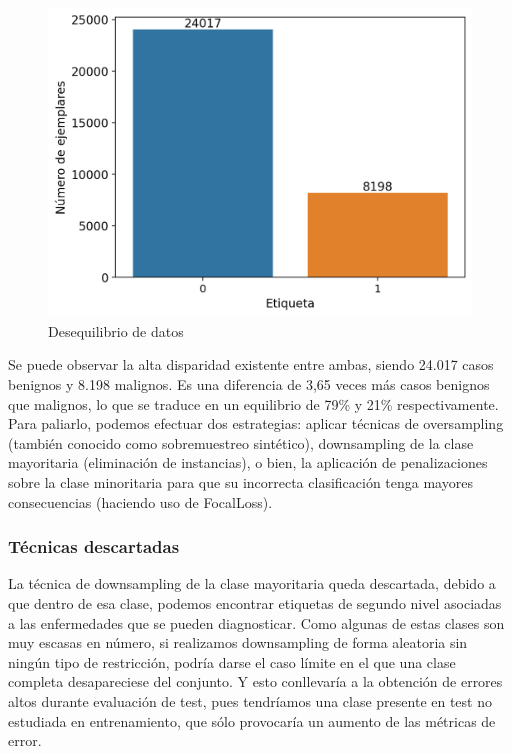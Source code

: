 \begin{figure}[H]
	\centering
	\label {desequilibriototal}
	\includegraphics[scale = 0.7]{imagenes/countBinary.png}
	\caption{Desequilibrio de datos}
\end{figure}

Se puede observar la alta disparidad existente entre ambas, siendo 24.017 casos benignos y 8.198 malignos. Es una diferencia de 3,65 veces más casos benignos que malignos, lo que se traduce en un equilibrio de  79\% y 21\% respectivamente. Para paliarlo, podemos efectuar dos estrategias: aplicar técnicas de oversampling (también conocido como sobremuestreo sintético), downsampling de la clase mayoritaria (eliminación de instancias), o bien, la aplicación de penalizaciones sobre la clase minoritaria para que su incorrecta clasificación tenga mayores consecuencias (haciendo uso de FocalLoss).\\

\subsubsection{Técnicas descartadas}

La técnica de downsampling de la clase mayoritaria queda descartada, debido a que dentro de esa clase, podemos encontrar etiquetas de segundo nivel asociadas a las enfermedades que se pueden diagnosticar. Como algunas de estas clases son muy escasas en número, si realizamos downsampling de forma aleatoria sin ningún tipo de restricción, podría darse el caso límite en el que una clase completa desapareciese del conjunto. Y esto conllevaría a la obtención de errores altos durante evaluación de test, pues tendríamos una clase presente en test no estudiada en entrenamiento, que sólo provocaría un aumento de las métricas de error. \\

